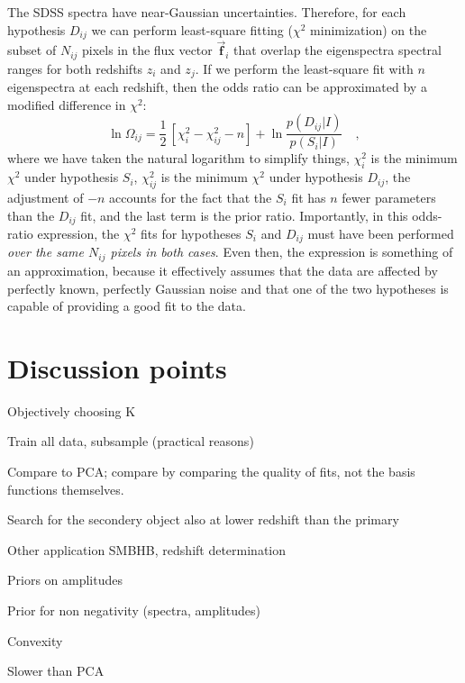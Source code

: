 \documentclass[12pt]{article}
\newcommand{\hoggvector}[1]{\boldsymbol{\vec{#1}}}
\newcommand{\fvec}{\hoggvector{f}}
\begin{document}
The SDSS spectra have near-Gaussian uncertainties.
Therefore, for each hypothesis $D_{ij}$ we can perform least-square
fitting ($\chi^2$ minimization) on the subset of $N_{ij}$ pixels in
the flux vector $\fvec_i$ that overlap the eigenspectra spectral
ranges for both redshifts $z_i$ and $z_j$.  If we perform the
least-square fit with $n$ eigenspectra at each redshift, then the odds
ratio can be approximated by a modified difference in $\chi^2$:
\begin{equation}
\ln\Omega_{ij}= \frac{1}{2}\,\left[\chi^2_i-\chi^2_{ij}-n\right]
 +\ln\frac{p(D_{ij}|I)}{p(S_i|I)} \quad,
\end{equation}
where we have taken the natural logarithm to simplify things,
$\chi^2_i$ is the minimum $\chi^2$ under hypothesis $S_i$,
$\chi^2_{ij}$ is the minimum $\chi^2$ under hypothesis $D_{ij}$, the
adjustment of $-n$ accounts for the fact that the $S_i$ fit has $n$
fewer parameters than the $D_{ij}$ fit, and the last term is the prior
ratio.  Importantly, in this odds-ratio expression, the $\chi^2$ fits
for hypotheses $S_i$ and $D_{ij}$ must have been performed \emph{over
the same $N_{ij}$ pixels in both cases}.  Even then, the expression is
something of an approximation, because it effectively assumes that the
data are affected by perfectly known, perfectly Gaussian noise and
that one of the two hypotheses is capable of providing a good fit to
the data.

\section{Discussion points}

Objectively choosing K

Train all data, subsample (practical reasons)

Compare to PCA; compare by comparing the quality of fits, not the basis functions themselves.

Search for the secondery object also at lower redshift than the primary

Other application SMBHB, redshift determination

Priors on amplitudes

Prior for non negativity (spectra, amplitudes)

Convexity

Slower than PCA
\end{document}
